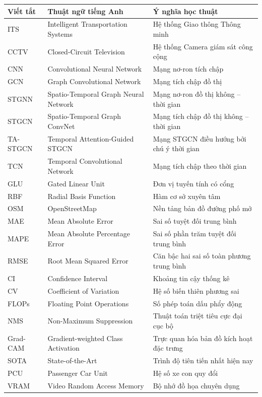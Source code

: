 \documentclass[12pt,a4paper,oneside]{report}
\begin{document}
\begin{table}[H]
\centering
\begin{tabularx}{\textwidth}{l p{4.5cm} X}
\toprule
\textbf{Viết tắt} & \textbf{Thuật ngữ tiếng Anh} & \textbf{Ý nghĩa học thuật} \\
\midrule
ITS & Intelligent Transportation Systems & Hệ thống Giao thông Thông minh \\
CCTV & Closed-Circuit Television & Hệ thống Camera giám sát công cộng \\
CNN & Convolutional Neural Network & Mạng nơ-ron tích chập \\
GCN & Graph Convolutional Network & Mạng tích chập đồ thị \\
STGNN & Spatio-Temporal Graph Neural Network & Mạng nơ-ron đồ thị không -- thời gian \\
STGCN & Spatio-Temporal Graph ConvNet & Mạng tích chập đồ thị không -- thời gian \\
TA-STGCN & Temporal Attention-Guided STGCN & Mạng STGCN điều hướng bởi chú ý thời gian \\
TCN & Temporal Convolutional Network & Mạng tích chập theo thời gian \\
GLU & Gated Linear Unit & Đơn vị tuyến tính có cổng \\
RBF & Radial Basis Function & Hàm cơ sở xuyên tâm \\
OSM & OpenStreetMap & Nền tảng bản đồ đường phố mở \\
MAE & Mean Absolute Error & Sai số tuyệt đối trung bình \\
MAPE & Mean Absolute Percentage Error & Sai số phần trăm tuyệt đối trung bình \\
RMSE & Root Mean Squared Error & Căn bậc hai sai số toàn phương trung bình \\
CI & Confidence Interval & Khoảng tin cậy thống kê \\
CV & Coefficient of Variation & Hệ số biến thiên phương sai \\
FLOPs & Floating Point Operations & Số phép toán dấu phẩy động \\
NMS & Non-Maximum Suppression & Thuật toán triệt tiêu cực đại cục bộ \\
Grad-CAM & Gradient-weighted Class Activation & Trực quan hóa bản đồ kích hoạt đặc trưng \\
SOTA & State-of-the-Art & Trình độ tiên tiến nhất hiện nay \\
PCU & Passenger Car Unit & Hệ số xe con quy đổi \\
VRAM & Video Random Access Memory & Bộ nhớ đồ họa chuyên dụng \\
\bottomrule
\end{tabularx}
\end{table}
\end{document}

